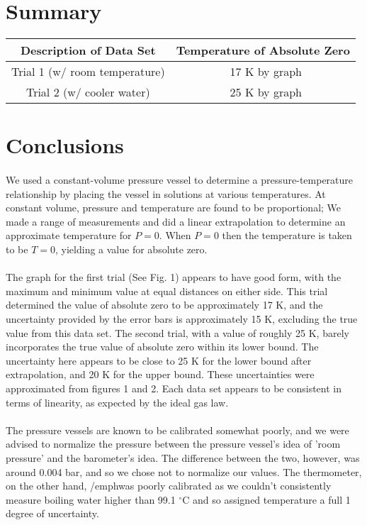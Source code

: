 \documentclass[11pt,letterpaper]{report}
\begin{document}

\pagebreak

\section*{Summary}
\begin{tabular}{ | c | c | }
\hline
Description of Data Set & Temperature of Absolute Zero \\
\hline
Trial 1 (w/ room temperature) & ~17 K by graph  \\
Trial 2 (w/ cooler water) &  ~25 K by graph \\
\hline
\end{tabular}


\section*{Conclusions}
\paragraph{}
We used a constant-volume pressure vessel to determine a pressure-temperature relationship by placing the vessel in solutions at various temperatures. At constant volume, pressure and temperature are found to be proportional; We made a range of measurements and did a linear extrapolation to determine an approximate temperature for $P = 0$. When $P = 0$ then the temperature is taken to be $T = 0$, yielding a value for absolute zero.
\paragraph{}
The graph for the first trial (See Fig. 1) appears to have good form, with the maximum and minimum value at equal distances on either side. This trial determined the value of absolute zero to be approximately 17 K, and the uncertainty provided by the error bars is approximately 15 K, excluding the true value from this data set. The second trial, with a value of roughly 25 K, barely incorporates the true value of absolute zero within its lower bound. The uncertainty here appears to be close to 25 K for the lower bound after extrapolation, and 20 K for the upper bound. These uncertainties were approximated from figures 1 and 2. Each data set appears to be consistent in terms of linearity, as expected by the ideal gas law.
\paragraph{}
The pressure vessels are known to be calibrated somewhat poorly, and we were advised to normalize the pressure between the pressure vessel's idea of 'room pressure' and the barometer's idea. The difference between the two, however, was around 0.004 bar, and so we chose not to normalize our values. The thermometer, on the other hand, /emph{was} poorly calibrated as we couldn't consistently measure boiling water higher than 99.1 $^\circ$C and so assigned temperature a full 1 degree of uncertainty.
\end{document}
